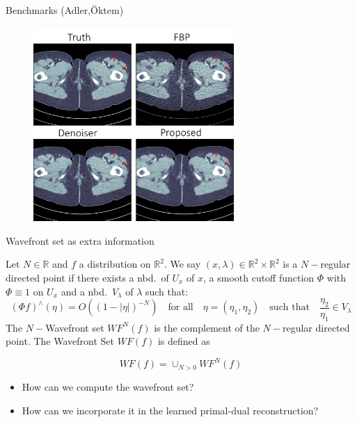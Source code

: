 \begin{frame}{Benchmarks (Adler,\"Oktem)}
\begin{figure}[!tbp]
  \centering
    \includegraphics[width= 0.68\textwidth]{Images/lpdrec.png}
\end{figure}
\end{frame}


\begin{frame}{Wavefront set as extra information}
\begin{definition}
Let $N\in\mathbb{R}$ and $f$ a distribution on $\mathbb{R}^2$. We say $(x,\lambda)\in \mathbb{R}^2\times \mathbb{R}^2$ is a $N-$regular directed point if there exists a nbd.\ of $U_x$ of $x$, a smooth cutoff function $\Phi$ with $\Phi\equiv 1$ on $U_x$ and a nbd.\ $V_{\lambda}$ of $\lambda$ such that:
$$
(\Phi f)^{\wedge}(\eta)=O((1-|\eta|)^{-N}) \quad \text{for all}\quad \eta=(\eta_1,\eta_2) \quad \text{such that}\quad \frac{\eta_2}{\eta_1}\in V_{\lambda}
$$
The $N-$Wavefront set $WF^N(f)$ is the complement of the $N-$regular directed point. The Wavefront Set $WF(f)$ is defined as 

\begin{equation}
\label{eq:Wavefront-set}
WF(f)=\cup_{N>0}WF^N(f)
\end{equation}
\end{definition}

\pause
\bigskip
\begin{itemize}
\item How can we compute the wavefront set?
\item How can we incorporate it in the learned primal-dual reconstruction?
\end{itemize}
\end{frame}

